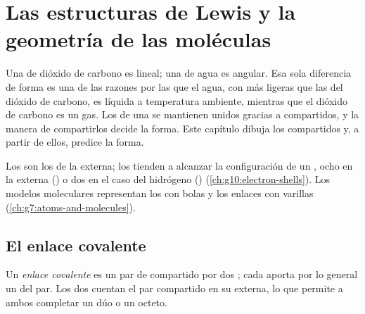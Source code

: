 \chapter{Las estructuras de Lewis y la geometría de las moléculas}\label{ch:g10:lewis-and-shape}

Una  de dióxido de carbono es lineal; una  de agua es
angular. Esa sola diferencia de forma es una de las razones por las que
el agua, con  más ligeras que las del dióxido de carbono, es
líquida a temperatura ambiente, mientras que el dióxido de carbono es un
gas. Los  de una  se mantienen unidos gracias a
 compartidos, y la manera de compartirlos decide la forma.
Este capítulo dibuja los  compartidos y, a partir de ellos,
predice la forma.

\begin{recall}
Los  son los de la  externa; los 
tienden a alcanzar la configuración de un , ocho  en
la  externa () o dos en el caso del hidrógeno () (\cref{ch:g10:electron-shells}). Los modelos moleculares
representan los  con bolas y los enlaces con varillas
(\cref{ch:g7:atoms-and-molecules}).
\end{recall}

\section{El enlace covalente}

\begin{definition}\label{def:g10:lewis-and-shape:covalent-bond}
Un \emph{enlace covalente} es un par de
 compartido por dos ; cada  aporta por lo general
un  del par. Los dos  cuentan el par compartido en su 
externa, lo que permite a ambos completar un dúo o un octeto.
\end{definition}

